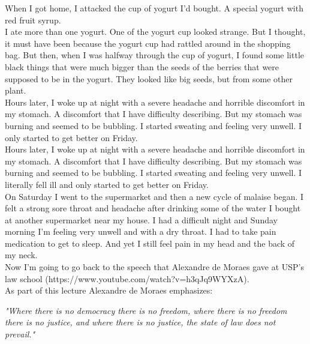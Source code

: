 \documentclass[11pt]{book}
\begin{document}
\noindent When I got home, I attacked the cup of yogurt I'd bought. A special yogurt with red fruit syrup. \\

\noindent I ate more than one yogurt. One of the yogurt cup looked strange. But I thought, it must have been because the yogurt cup had rattled around in the shopping bag. But then, when I was halfway through the cup of yogurt, I found some little black things that were much bigger than the seeds of the berries that were supposed to be in the yogurt. They looked like big seeds, but from some other plant. \\

\noindent Hours later, I woke up at night with a severe headache and horrible discomfort in my stomach. A discomfort that I have difficulty describing. But my stomach was burning and seemed to be bubbling. I started sweating and feeling very unwell. I only started to get better on Friday. \\

\noindent Hours later, I woke up at night with a severe headache and horrible discomfort in my stomach. A discomfort that I have difficulty describing. But my stomach was burning and seemed to be bubbling. I started sweating and feeling very unwell. I literally fell ill and only started to get better on Friday. \\

\noindent On Saturday I went to the supermarket and then a new cycle of malaise began. I felt a strong sore throat and headache after drinking some of the water I bought at another supermarket near my house. I had a difficult night and Sunday morning I'm feeling very unwell and with a dry throat. I had to take pain medication to get to sleep. And yet I still feel pain in my head and the back of my neck. \\

\noindent Now I'm going to go back to the speech that Alexandre de Moraes gave at USP's law school (https://www.youtube.com/watch?v=h3qJq9WYXzA). \\

\noindent As part of this lecture Alexandre de Moraes emphasizes:

\noindent \begin{center} \emph{"Where there is no democracy there is no freedom, where there is no freedom there is no justice, and where there is no justice, the state of law does not prevail."} \end{center}
\end{document}
